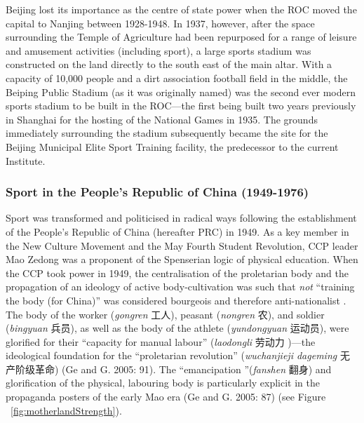 {Beijing lost its importance as the centre of state power when the ROC moved the capital to Nanjing between 1928-1948.  In 1937, however, after the space surrounding the Temple of Agriculture had been repurposed for a range of leisure and amusement activities (including sport), a large sports stadium was constructed on the land directly to the south east of the main altar.  With a capacity of 10,000 people and a dirt association football field in the middle, the Beiping Public Stadium (as it was originally named) was the second ever modern sports stadium to be built in the ROC---the first being built two years previously in Shanghai for the hosting of the National Games in 1935.  The grounds immediately surrounding the stadium subsequently became the site for the Beijing Municipal Elite Sport Training facility, the predecessor to the current Institute.


\subsubsection{Sport in the People's Republic of China (1949-1976)}
Sport was transformed and politicised in radical ways following the establishment of the People’s Republic of China (hereafter PRC) in 1949.  As a key member in the New Culture Movement and the May Fourth Student Revolution, CCP leader Mao Zedong was a proponent of the Spenserian logic of physical education.   When the CCP took power in 1949, the centralisation of the proletarian body and the propagation of an ideology of active body-cultivation was such that \textit{not} ``training the body (for China)'' was considered bourgeois and therefore anti-nationalist \citep[58]{Brownell1995}.  The body of the worker (\textit{gongren} 工人), peasant (\textit{nongren} 农), and soldier (\textit{bingyuan} 兵员), as well as the body of the athlete (\textit{yundongyuan} 运动员), were glorified for their ``capacity for manual labour'' (\textit{laodongli} 劳动力 )---the ideological foundation for the ``proletarian revolution'' (\textit{wuchanjieji dageming} 无产阶级革命) (Ge and G. 2005: 91).  The ``emancipation ''(\textit{fanshen} 翻身) and glorification of the physical, labouring body is particularly explicit in the propaganda posters of the early Mao era (Ge and G. 2005: 87) (see Figure ~\ref{fig:motherlandStrength}).

}
